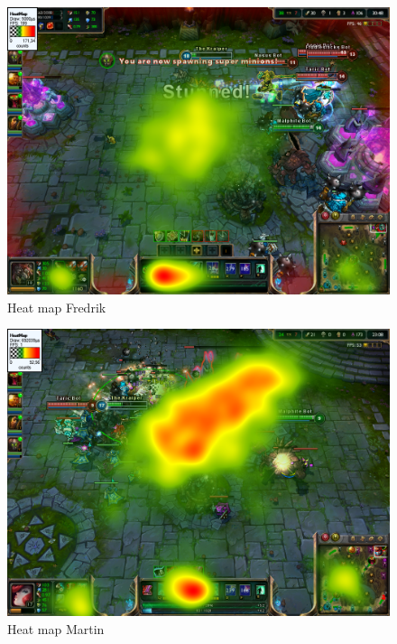 \documentclass{article}
\begin{document}
\begin{figure}[h!]
\begin{center}
\includegraphics*[width=0.90\columnwidth]{images/heatmap/Fredrik}
\end{center}
\caption{Heat map Fredrik}
\label{heat_fre}
\end{figure}

\begin{figure}[h!]
\begin{center}
\includegraphics*[width=0.90\columnwidth]{images/heatmap/Martin}
\end{center}
\caption{Heat map Martin}
\label{heat_mar}
\end{figure}
\end{document}
